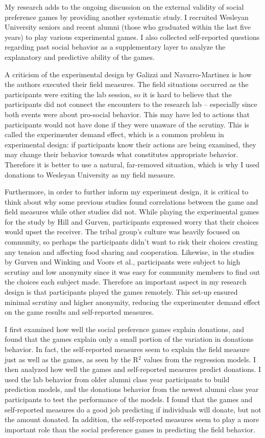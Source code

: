 \documentclass[12pt]{article}
\begin{document}
My research adds to the ongoing discussion on the external validity of social preference games by providing another systematic study. I recruited Wesleyan University seniors and recent alumni (those who graduated within the last five years) to play various experimental games. I also collected self-reported questions regarding past social behavior as a supplementary layer to analyze the explanatory and predictive ability of the games.

A criticism of the experimental design by Galizzi and Navarro-Martinez is how the authors executed their field measures. The field situations occurred as the participants were exiting the lab session, so it is hard to believe that the participants did not connect the encounters to the research lab -- especially since both events were about pro-social behavior. This may have led to actions that participants would not have done if they were unaware of the scrutiny. This is called the experimenter demand effect, which is a common problem in experimental design: if participants know their actions are being examined, they may change their behavior towards what constitutes appropriate behavior. Therefore it is better to use a natural, far-removed situation, which is why I used donations to Wesleyan University as my field measure.

Furthermore, in order to further inform my experiment design, it is critical to think about why some previous studies found correlations between the game and field measures while other studies did not. While playing the experimental games for the study by Hill and Gurven, participants expressed worry that their choices would upset the receiver. The tribal group\rq s culture was heavily focused on community, so perhaps the participants didn\rq t want to risk their choices creating any tension and affecting food sharing and cooperation. Likewise, in the studies by Gurven and Winking and Voors et al., participants were subject to high scrutiny and low anonymity since it was easy for community members to find out the choices each subject made. Therefore an important aspect in my research design is that participants played the games remotely. This set-up ensured minimal scrutiny and higher anonymity, reducing the experimenter demand effect on the game results and self-reported measures.

I first examined how well the social preference games explain donations, and found that the games explain only a small portion of the variation in donations behavior. In fact, the self-reported measures seem to explain the field measure just as well as the games, as seen by the R$^{2}$ values from the regression models. I then analyzed how well the games and self-reported measures predict donations. I used the lab behavior from older alumni class year participants to build prediction models, and the donations behavior from the newest alumni class year participants to test the performance of the models. I found that the games and self-reported measures do a good job predicting if individuals will donate, but not the amount donated. In addition, the self-reported measures seem to play a more important role than the social preference games in predicting the field behavior.
\end{document}
